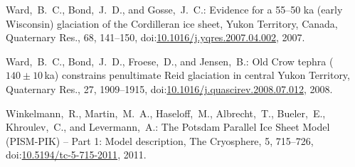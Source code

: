 \documentclass[tc, manuscript]{copernicus}
\begin{document}
\begin{thebibliography}{114}
Ward,~B.~C., Bond,~J.~D., and Gosse,~J.~C.: Evidence for a 55--50 ka (early Wisconsin) glaciation of the Cordilleran ice sheet, Yukon Territory, Canada, Quaternary Res., 68, 141--150,
doi:\href{http://dx.doi.org/10.1016/j.yqres.2007.04.002}{10.1016/j.yqres.2007.04.002}, 2007.


Ward,~B.~C., Bond,~J.~D., Froese,~D., and Jensen,~B.: Old Crow tephra ($140\pm10$\,ka) constrains penultimate Reid glaciation in central Yukon Territory, Quaternary Res., 27, 1909--1915,
doi:\href{http://dx.doi.org/10.1016/j.quascirev.2008.07.012}{10.1016/j.quascirev.2008.07.012}, 2008.


 Winkelmann,~R., Martin,~M.~A., Haseloff,~M., Albrecht,~T., Bueler,~E., Khroulev,~C., and Levermann,~A.: The Potsdam Parallel Ice Sheet Model (PISM-PIK) -- Part 1: Model description, The Cryosphere, 5, 715--726,
doi:\href{http://dx.doi.org/10.5194/tc-5-715-2011}{10.5194/tc-5-715-2011}, 2011.


\end{thebibliography}


\clearpage{}  %
\end{document}
